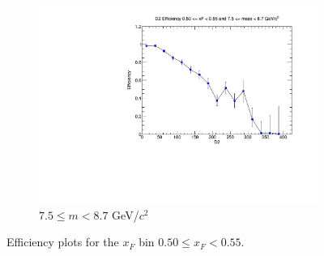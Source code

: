 \documentclass[11pt]{article}
\begin{document}
\begin{figure}[p]
\begin{subfigure}[b]{0.32\textwidth}
        \includegraphics[width=\textwidth]{./kTrackerEfficiencyPlots/D2_Efficiency_xF10_mass10.pdf}
        \caption{$7.5 \leq m < 8.7$ GeV/$c^2$}
    \end{subfigure}
    \caption{Efficiency plots for the $x_F$ bin $0.50 \leq x_F < 0.55$.}
\end{figure}
\end{document}
